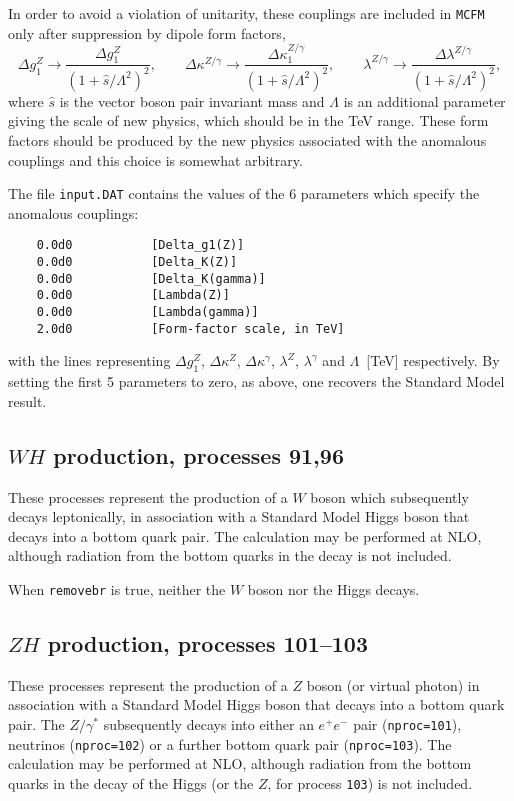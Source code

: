 \documentclass[12pt]{article}
\begin{document}
In order to avoid a violation of unitarity, these couplings are included
in {\tt MCFM} only after suppression by dipole form factors,
\begin{displaymath}
\Delta g_1^Z \rightarrow \frac{\Delta g_1^Z}{(1+\hat{s}/\Lambda^2)^2}, \qquad
\Delta \kappa^{Z/\gamma} \rightarrow
 \frac{\Delta \kappa_1^{Z/\gamma}}{(1+\hat{s}/\Lambda^2)^2}, \qquad
\lambda^{Z/\gamma} \rightarrow
 \frac{\Delta \lambda^{Z/\gamma}}{(1+\hat{s}/\Lambda^2)^2},
\end{displaymath}
where $\hat{s}$ is the vector boson pair invariant mass and $\Lambda$
is an additional parameter giving the scale of new physics, which should
be in the TeV range.
These form factors should be produced by the new physics associated with the
anomalous couplings and this choice is somewhat arbitrary.

The file {\tt input.DAT} contains the values of the $6$ parameters
which specify the anomalous couplings:
\begin{verbatim}
    0.0d0           [Delta_g1(Z)]
    0.0d0           [Delta_K(Z)]
    0.0d0           [Delta_K(gamma)]
    0.0d0           [Lambda(Z)]
    0.0d0           [Lambda(gamma)]
    2.0d0           [Form-factor scale, in TeV]
\end{verbatim}
with the lines representing $\Delta g_1^Z$, $\Delta \kappa^Z$,
$\Delta \kappa^\gamma$, $\lambda^Z$, $\lambda^\gamma$ and
$\Lambda$~[TeV] respectively. By setting the first 5 parameters to zero,
as above, one recovers the Standard Model result.

\subsection{$WH$ production, processes 91,96}
\label{subsec:wh}

These processes represent the production of a $W$ boson which subsequently
decays leptonically, in association with a Standard Model Higgs boson that
decays into a bottom quark pair.
The calculation may be performed at NLO, although radiation from the
bottom quarks in the decay is not included.

When {\tt removebr} is true, neither the $W$ boson nor the Higgs decays.

\subsection{$ZH$ production, processes 101--103}
\label{subsec:zh}

These processes represent the production of a $Z$ boson (or virtual photon)
in association with a Standard Model Higgs boson that
decays into a bottom quark pair. The $Z/\gamma^*$ subsequently decays into 
either an $e^+ e^-$ pair ({\tt nproc=101}), neutrinos ({\tt nproc=102})
or a further bottom quark pair ({\tt nproc=103}).
The calculation may be performed at NLO, although radiation from the
bottom quarks in the decay of the Higgs (or the $Z$, for process
{\tt 103}) is not included.
\end{document}

